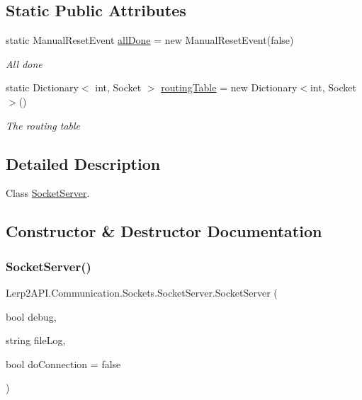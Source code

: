 \subsection*{Static Public Attributes}
\begin{DoxyCompactItemize}
\item 
static Manual\+Reset\+Event \hyperlink{class_lerp2_a_p_i_1_1_communication_1_1_sockets_1_1_socket_server_a89a4f48a027923ed2ebadb582c3cabb0}{all\+Done} = new Manual\+Reset\+Event(false)
\begin{DoxyCompactList}\small\item\em All done \end{DoxyCompactList}\item 
static Dictionary$<$ int, Socket $>$ \hyperlink{class_lerp2_a_p_i_1_1_communication_1_1_sockets_1_1_socket_server_aa63dac3e74b7b57c4cf1762ed636f605}{routing\+Table} = new Dictionary$<$int, Socket$>$()
\begin{DoxyCompactList}\small\item\em The routing table \end{DoxyCompactList}\end{DoxyCompactItemize}


\subsection{Detailed Description}
Class \hyperlink{class_lerp2_a_p_i_1_1_communication_1_1_sockets_1_1_socket_server}{Socket\+Server}. 



\subsection{Constructor \& Destructor Documentation}
\mbox{\label{class_lerp2_a_p_i_1_1_communication_1_1_sockets_1_1_socket_server_a0345e504a8bbd0b825865dfd58693b37}} 
\subsubsection{\texorpdfstring{Socket\+Server()}{SocketServer()}\hspace{0.1cm}{\footnotesize\ttfamily [1/3]}}
{\footnotesize\ttfamily Lerp2\+A\+P\+I.\+Communication.\+Sockets.\+Socket\+Server.\+Socket\+Server (\begin{DoxyParamCaption}\item[{bool}]{debug,  }\item[{string}]{file\+Log,  }\item[{bool}]{do\+Connection = {\ttfamily false} }\end{DoxyParamCaption})\hspace{0.3cm}{\ttfamily [inline]}}




